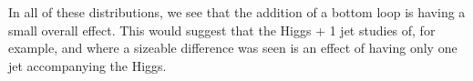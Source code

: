 In all of these distributions, we see that the addition of a bottom loop is having a small overall effect. This would suggest that the Higgs + 1 jet studies of, for example, \cite{Lindert2017} and \cite{Grazzini2013} where a sizeable difference was seen is an effect of having only one jet accompanying the Higgs. 

